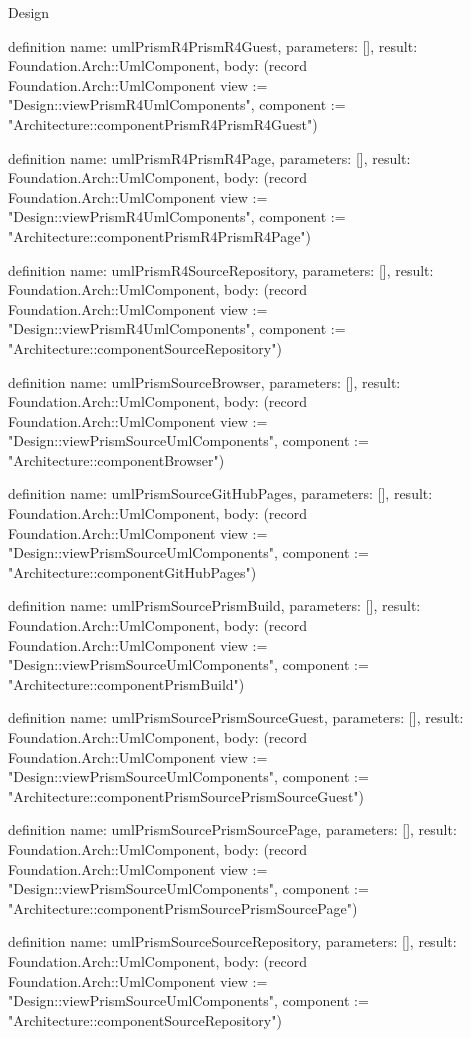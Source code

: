 \begin{lexlean}{Design}
\begin{semanticmodule}
definition{
  name: umlPrismR4PrismR4Guest,
  parameters: [],
  result: Foundation.Arch::UmlComponent,
  body: (record Foundation.Arch::UmlComponent {view := "Design::viewPrismR4UmlComponents", component := "Architecture::componentPrismR4PrismR4Guest"})
}

definition{
  name: umlPrismR4PrismR4Page,
  parameters: [],
  result: Foundation.Arch::UmlComponent,
  body: (record Foundation.Arch::UmlComponent {view := "Design::viewPrismR4UmlComponents", component := "Architecture::componentPrismR4PrismR4Page"})
}

definition{
  name: umlPrismR4SourceRepository,
  parameters: [],
  result: Foundation.Arch::UmlComponent,
  body: (record Foundation.Arch::UmlComponent {view := "Design::viewPrismR4UmlComponents", component := "Architecture::componentSourceRepository"})
}

definition{
  name: umlPrismSourceBrowser,
  parameters: [],
  result: Foundation.Arch::UmlComponent,
  body: (record Foundation.Arch::UmlComponent {view := "Design::viewPrismSourceUmlComponents", component := "Architecture::componentBrowser"})
}

definition{
  name: umlPrismSourceGitHubPages,
  parameters: [],
  result: Foundation.Arch::UmlComponent,
  body: (record Foundation.Arch::UmlComponent {view := "Design::viewPrismSourceUmlComponents", component := "Architecture::componentGitHubPages"})
}

definition{
  name: umlPrismSourcePrismBuild,
  parameters: [],
  result: Foundation.Arch::UmlComponent,
  body: (record Foundation.Arch::UmlComponent {view := "Design::viewPrismSourceUmlComponents", component := "Architecture::componentPrismBuild"})
}

definition{
  name: umlPrismSourcePrismSourceGuest,
  parameters: [],
  result: Foundation.Arch::UmlComponent,
  body: (record Foundation.Arch::UmlComponent {view := "Design::viewPrismSourceUmlComponents", component := "Architecture::componentPrismSourcePrismSourceGuest"})
}

definition{
  name: umlPrismSourcePrismSourcePage,
  parameters: [],
  result: Foundation.Arch::UmlComponent,
  body: (record Foundation.Arch::UmlComponent {view := "Design::viewPrismSourceUmlComponents", component := "Architecture::componentPrismSourcePrismSourcePage"})
}

definition{
  name: umlPrismSourceSourceRepository,
  parameters: [],
  result: Foundation.Arch::UmlComponent,
  body: (record Foundation.Arch::UmlComponent {view := "Design::viewPrismSourceUmlComponents", component := "Architecture::componentSourceRepository"})
}


\end{semanticmodule}
\end{lexlean}
